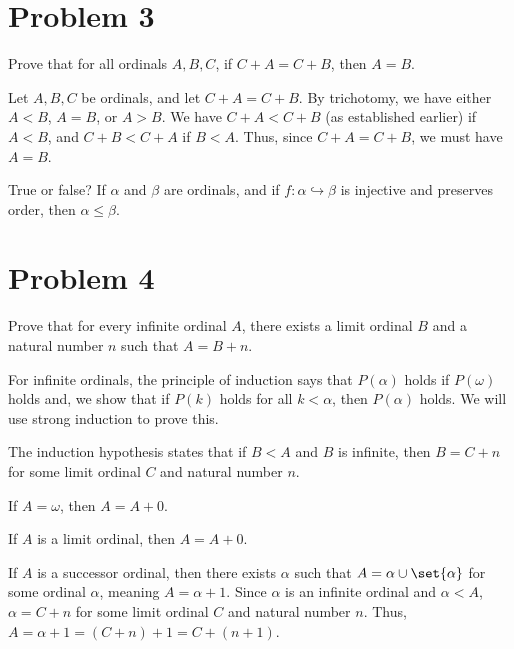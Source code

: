 \documentclass[10pt]{mypackage}
\begin{document}
\section{Problem 3}%
\begin{problem}
  Prove that for all ordinals $A,B,C$, if $C+A = C+B$, then $A=B$.
\end{problem}
\begin{solution}
  Let $A,B,C$ be ordinals, and let $C+A = C+B$. By trichotomy, we have either $A < B$, $A = B$, or $A > B$. We have $C + A < C + B$ (as established earlier) if $A < B$, and $C + B < C + A$ if $B < A$. Thus, since $C+A = C+B$, we must have $A = B$.
\end{solution}
\begin{question}
  True or false? If $\alpha$ and $\beta$ are ordinals, and if $f: \alpha \hookrightarrow \beta$ is injective and preserves order, then $\alpha \leq \beta$.
\end{question}
\section{Problem 4}%
\begin{problem}
  Prove that for every infinite ordinal $A$, there exists a limit ordinal $B$ and a natural number $n$ such that $A = B + n$.
\end{problem}
\begin{solution}
  For infinite ordinals, the principle of induction says that $P(\alpha)$ holds if $P(\omega)$ holds and, we show that if $P(k)$ holds for all $k < \alpha$, then $P(\alpha)$ holds. We will use strong induction to prove this.\newline

  The induction hypothesis states that if $B < A$ and $B$ is infinite, then $B = C+n$ for some limit ordinal $C$ and natural number $n$.\newline

  If $A = \omega$, then $A = A+ 0$.\newline

  If $A$ is a limit ordinal, then $A = A + 0$.\newline

  If $A$ is a successor ordinal, then there exists $\alpha$ such that $A = \alpha \cup \set{\alpha}$ for some ordinal $\alpha$, meaning $A = \alpha + 1$. Since $\alpha$ is an infinite ordinal and $\alpha < A$, $\alpha = C + n$ for some limit ordinal $C$ and natural number $n$. Thus, $A = \alpha + 1 = \left(C+n\right)+1=C + \left(n+1\right)$.
\end{solution}
\end{document}
